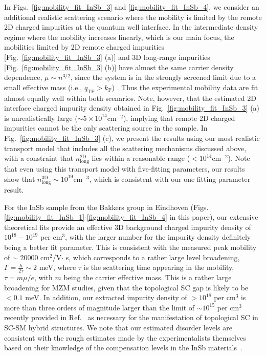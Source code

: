 \documentclass[aps,prmaterials,twocolumn,superscriptaddress,longbibliography]{revtex4-2}
\begin{document}
  In Figs.~\ref{fig:mobility_fit_InSb_3} and \ref{fig:mobility_fit_InSb_4}, we consider an additional realistic scattering scenario where the mobility is limited by the remote 2D charged impurities at the quantum well interface. In the intermediate density regime where the mobility increases linearly, which is our main focus, the mobilities limited by 2D remote charged impurities [Fig.~\ref{fig:mobility_fit_InSb_3} (a)] and 3D long-range impurities [Fig.~\ref{fig:mobility_fit_InSb_3} (b)] have almost the same carrier density dependence, $\mu\sim n^{3/2}$, since the system is in the strongly screened limit due to a small effective mass (i.e., $q_\mathrm{TF}>k_\mathrm{F}$) \cite{dassarma2013universal}. Thus the experimental mobility data are fit almost equally well within both scenarios. 
 Note, however, that the estimated 2D interface charged impurity density obtained in Fig.~\ref{fig:mobility_fit_InSb_3} (a) is unrealistically large ($\sim 5\times 10^{14} \mathrm{cm}^{-2}$), implying that remote 2D charged impurities cannot be the only scattering source in the sample. In Fig.~\ref{fig:mobility_fit_InSb_3} (c), we present the results using our most realistic transport model that includes all the scattering mechanisms discussed above, with a constraint that $n_\mathrm{long}^\mathrm{2D}$ lies within a reasonable range ($<10^{14}\mathrm{cm}^{-2}$). Note that even using this transport model with five-fitting parameters, our results show that $n_\mathrm{long}^\mathrm{3D}\sim 10^{19}\mathrm{cm}^{-3}$, which is consistent with our one fitting parameter result. 

For the InSb sample from the Bakkers group in Eindhoven (Figs. \ref{fig:mobility_fit_InSb_1}-\ref{fig:mobility_fit_InSb_4} in this paper), our extensive theoretical fits provide an effective 3D background charged impurity density of $ 10^{18}-10^{19} $  per cm$ ^3 $, with the larger number for the impurity density definitely being a better fit parameter. This is consistent with the measured peak mobility of $ \sim $  20000 cm$ ^2 $/V$ \cdot $ s, which corresponds to a rather large level broadening, $ \Gamma=\frac{\hbar}{2\tau}\sim 2 $ meV, where $ \tau $  is the scattering time appearing in the mobility, $ \tau= m \mu/e $,  with $ m $  being the carrier effective mass. This is a rather large broadening for MZM studies, given that the topological SC gap is likely to be $ <0.1 $  meV.  In addition, our extracted impurity density of $ > 10^{18} $  per cm$ ^3 $ is more than three orders of magnitude larger than the limit of $ \sim 10^{15} $  per cm$ ^3 $  recently provided in Ref.~ as necessary for the manifestation of topological SC in SC-SM hybrid structures. We note that our estimated disorder levels are consistent with the rough estimates made by the experimentalists themselves based on their knowledge of the compensation levels in the InSb materials~\cite{bakkers}. 
\end{document}
